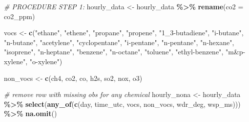 \documentclass[
]{article}
\newenvironment{Shaded}{\begin{snugshade}}{\end{snugshade}}
\newcommand{\CommentTok}[1]{\textcolor[rgb]{0.56,0.35,0.01}{\textit{#1}}}
\newcommand{\FunctionTok}[1]{\textcolor[rgb]{0.13,0.29,0.53}{\textbf{#1}}}
\newcommand{\NormalTok}[1]{#1}
\newcommand{\OtherTok}[1]{\textcolor[rgb]{0.56,0.35,0.01}{#1}}
\newcommand{\SpecialCharTok}[1]{\textcolor[rgb]{0.81,0.36,0.00}{\textbf{#1}}}
\newcommand{\StringTok}[1]{\textcolor[rgb]{0.31,0.60,0.02}{#1}}
\begin{document}
\begin{Shaded}
\begin{Highlighting}[]
\CommentTok{\# PROCEDURE STEP 1:}
\NormalTok{hourly\_data }\OtherTok{\textless{}{-}}\NormalTok{ hourly\_data }\SpecialCharTok{\%\textgreater{}\%} \FunctionTok{rename}\NormalTok{(}\StringTok{\textquotesingle{}co2\textquotesingle{}} \OtherTok{=} \StringTok{\textquotesingle{}co2\_ppm\textquotesingle{}}\NormalTok{)}

\NormalTok{vocs }\OtherTok{\textless{}{-}} \FunctionTok{c}\NormalTok{(}\StringTok{"ethane"}\NormalTok{, }\StringTok{"ethene"}\NormalTok{, }\StringTok{"propane"}\NormalTok{, }\StringTok{"propene"}\NormalTok{,}
                                        \StringTok{"1\_3{-}butadiene"}\NormalTok{, }\StringTok{"i{-}butane"}\NormalTok{, }\StringTok{"n{-}butane"}\NormalTok{,}
                                        \StringTok{"acetylene"}\NormalTok{, }\StringTok{"cyclopentane"}\NormalTok{, }\StringTok{"i{-}pentane"}\NormalTok{,}
                                        \StringTok{"n{-}pentane"}\NormalTok{, }\StringTok{"n{-}hexane"}\NormalTok{, }\StringTok{"isoprene"}\NormalTok{, }\StringTok{"n{-}heptane"}\NormalTok{,}
                                        \StringTok{"benzene"}\NormalTok{, }\StringTok{"n{-}octane"}\NormalTok{, }\StringTok{"toluene"}\NormalTok{, }\StringTok{"ethyl{-}benzene"}\NormalTok{, }
                                        \StringTok{"m\&p{-}xylene"}\NormalTok{, }\StringTok{"o{-}xylene"}\NormalTok{)}


\NormalTok{non\_vocs }\OtherTok{\textless{}{-}} \FunctionTok{c}\NormalTok{(}\StringTok{\textquotesingle{}ch4\textquotesingle{}}\NormalTok{, }\StringTok{\textquotesingle{}co2\textquotesingle{}}\NormalTok{, }\StringTok{\textquotesingle{}co\textquotesingle{}}\NormalTok{, }\StringTok{\textquotesingle{}h2s\textquotesingle{}}\NormalTok{, }\StringTok{\textquotesingle{}so2\textquotesingle{}}\NormalTok{, }\StringTok{\textquotesingle{}nox\textquotesingle{}}\NormalTok{, }\StringTok{\textquotesingle{}o3\textquotesingle{}}\NormalTok{)}

\CommentTok{\# remove row with missing obs for any chemical}
\NormalTok{hourly\_nona }\OtherTok{\textless{}{-}}\NormalTok{ hourly\_data }\SpecialCharTok{\%\textgreater{}\%} 
  \FunctionTok{select}\NormalTok{(}\FunctionTok{any\_of}\NormalTok{(}\FunctionTok{c}\NormalTok{(}\StringTok{\textquotesingle{}day\textquotesingle{}}\NormalTok{, }\StringTok{\textquotesingle{}time\_utc\textquotesingle{}}\NormalTok{, vocs, non\_vocs, }\StringTok{\textquotesingle{}wdr\_deg\textquotesingle{}}\NormalTok{, }\StringTok{\textquotesingle{}wsp\_ms\textquotesingle{}}\NormalTok{))) }\SpecialCharTok{\%\textgreater{}\%} 
  \FunctionTok{na.omit}\NormalTok{()}


\end{Highlighting}
\end{Shaded}
\end{document}
